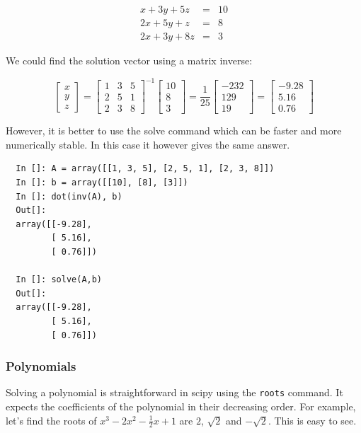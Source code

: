 \documentclass{article}
\begin{document}
    \begin{eqnarray} x+3y+5z & = & 10\\ 2x+5y+z & = & 8\\ 2x+3y+8z & = & 3\end{eqnarray}

We could find the solution vector using a matrix inverse:

    \[ \left[\begin{array}{c} x\\ y\\ z\end{array}\right]=\left[\begin{array}{ccc} 1 & 3 & 5\\ 2 & 5 & 1\\ 2 & 3 & 8\end{array}\right]^{-1}\left[\begin{array}{c} 10\\ 8\\ 3\end{array}\right]=\frac{1}{25}\left[\begin{array}{c} -232\\ 129\\ 19\end{array}\right]=\left[\begin{array}{c} -9.28\\ 5.16\\ 0.76\end{array}\right] \]

However, it is better to use the solve command which can be faster and
more numerically stable. In this case it however gives the same
answer.

\begin{lstlisting}
  In []: A = array([[1, 3, 5], [2, 5, 1], [2, 3, 8]])
  In []: b = array([[10], [8], [3]])
  In []: dot(inv(A), b)
  Out[]: 
  array([[-9.28],
         [ 5.16],
         [ 0.76]])

  In []: solve(A,b)
  Out[]: 
  array([[-9.28],
         [ 5.16],
         [ 0.76]])
\end{lstlisting}

\subsubsection{Polynomials}

Solving a polynomial is straightforward in scipy using the
\lstinline+roots+ command. It expects the coefficients of the
polynomial in their decreasing order. For example, let's find the
roots of $x^3 - 2x^2 - \frac{1}{2}x + 1$ are $2$, $\sqrt{2}$ and
$-\sqrt{2}$. This is easy to see.
\end{document}
